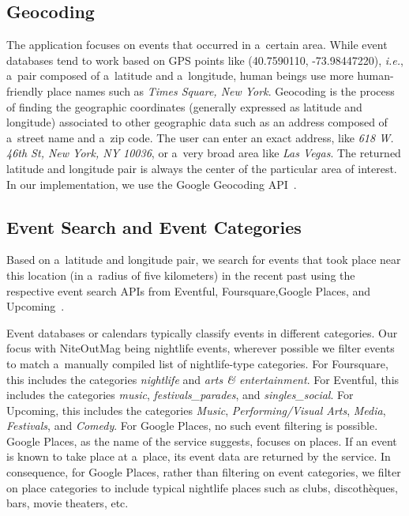 \documentclass[runningheads,a4paper]{llncs}
\begin{document}
{\subsection{Geocoding}
The application focuses on events that occurred in a~certain area. While event databases tend to work based on GPS points like
(40.7590110, -73.98447220), \emph{i.e.}, a~pair composed of a~latitude and a~longitude, human beings use more human-friendly place names such as \emph{Times Square, New York}. Geocoding is the process of finding the geographic coordinates (generally expressed as latitude and longitude) associated to other geographic data such as an address composed of a~street name and a~zip code. The user can enter an exact address, like \emph{618 W. 46th St, New York, NY 10036}, or a~very broad area like \emph{Las Vegas}. The returned latitude and longitude pair is always the center of the particular area of interest. In our implementation, we use the Google Geocoding API~\cite{Geocoding2012}.

\subsection{Event Search and Event Categories} \label{sec:event-search}
Based on a~latitude and longitude pair, we search for events that took place near this location (in a~radius of five kilometers) in the recent past using the respective event search APIs from Eventful, Foursquare,Google Places, and Upcoming~\cite{Eventful2012,Foursquare2012,GooglePlaces2012,Upcoming2012}.

Event databases or calendars typically classify events in different categories.
Our focus with NiteOutMag being nightlife events,
wherever possible we filter events to match
a~manually compiled list of nightlife-type categories.
For Foursquare, this includes the categories \emph{nightlife} and \emph{arts \& entertainment}.
For Eventful, this includes the categories \emph{music}, \emph{festivals\_parades}, and \emph{singles\_social}.
For Upcoming, this includes the categories \emph{Music}, \emph{Performing/Visual Arts}, \emph{Media}, \emph{Festivals}, and \emph{Comedy}.
For Google Places, no such event filtering is possible.
Google Places, as the name of the service suggests, focuses on places.
If an event is known to take place at a~place, its event data are returned by the service.
In consequence, for Google Places, rather than filtering on event categories,
we filter on place categories to include typical nightlife places
such as clubs, discothèques, bars, movie theaters, etc.

}
\end{document}
